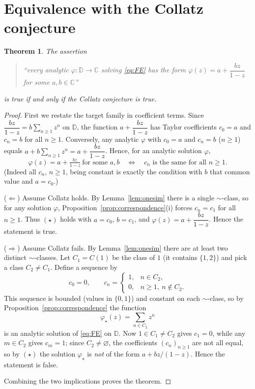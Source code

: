 \documentclass{amsart}
\newtheorem{theorem}{Theorem}
\theoremstyle{remark}
\begin{document}
\section{Equivalence with the Collatz conjecture}

\begin{theorem}\label{thm:main}
The assertion
\begin{quote}
``every analytic $\varphi:\mathbb{D}\to\mathbb{C}$ solving \eqref{eq:FE} has the form
$\varphi(z)=a+\dfrac{bz}{1-z}$ for some $a,b\in\mathbb{C}$''
\end{quote}
is true if and only if the Collatz conjecture is true.
\end{theorem}

\begin{proof}
First we restate the target family in coefficient terms. Since
$\dfrac{bz}{1-z}=b\sum_{n\ge1}z^n$ on $\mathbb{D}$, the function $a+\dfrac{bz}{1-z}$ has Taylor
coefficients $c_0=a$ and $c_n=b$ for all $n\ge1$. Conversely, any analytic $\varphi$ with
$c_0=a$ and $c_n=b$ ($n\ge1$) equals $a+b\sum_{n\ge1}z^n=a+\dfrac{bz}{1-z}$. Hence, for an analytic
solution $\varphi$,
\begin{equation}\label{eq:star}
\varphi(z)=a+\tfrac{bz}{1-z}\ \text{for some }a,b
\quad\Longleftrightarrow\quad
c_n \text{ is the same for all } n\ge1.\tag{$\star$}
\end{equation}
(Indeed all $c_n$, $n\ge1$, being constant is exactly the condition with $b$ that common value and
$a=c_0$.)

\smallskip
($\Leftarrow$) Assume Collatz holds. By Lemma~\ref{lem:onesim} there is a single $\sim$-class, so
for any solution $\varphi$, Proposition~\ref{prop:correspondence}(i) forces $c_n=c_1$ for all
$n\ge1$. Thus $(\star)$ holds with $a=c_0$, $b=c_1$, and $\varphi(z)=a+\dfrac{bz}{1-z}$. Hence the
statement is true.

\smallskip
($\Rightarrow$) Assume Collatz fails. By Lemma~\ref{lem:onesim} there are at least two distinct
$\sim$-classes. Let $C_1=C(1)$ be the class of $1$ (it contains $\{1,2\}$) and pick a class
$C_2\ne C_1$. Define a sequence by
\[
c_0=0,\qquad c_n=\begin{cases}1,& n\in C_2,\\ 0,& n\ge1,\ n\notin C_2.\end{cases}
\]
This sequence is bounded (values in $\{0,1\}$) and constant on each $\sim$-class, so by
Proposition~\ref{prop:correspondence} the function
\[
\varphi_\star(z)=\sum_{n\in C_2} z^n
\]
is an analytic solution of \eqref{eq:FE} on $\mathbb{D}$. Now $1\in C_1\ne C_2$ gives $c_1=0$,
while any $m\in C_2$ gives $c_m=1$; since $C_2\ne\varnothing$, the coefficients $(c_n)_{n\ge1}$ are
not all equal, so by $(\star)$ the solution $\varphi_\star$ is \emph{not} of the form
$a+bz/(1-z)$. Hence the statement is false.

\smallskip
Combining the two implications proves the theorem.
\end{proof}
\end{document}
